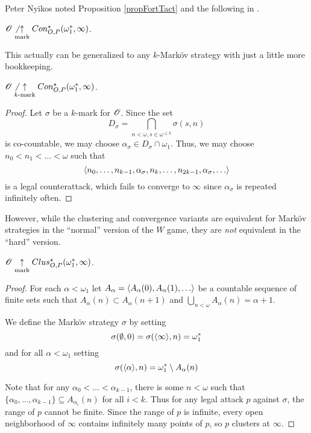 Peter Nyikos noted Proposition \ref{propFortTact} and the following in
\cite{MR1031771}.

\begin{thm}
  $\mathscr{O} \not\underset{\text{mark}}{\uparrow} Con_{O,P}^\star(\omega^*_1,\infty)$.
\end{thm}

This actually can be generalized to any $k$-Mark\"ov strategy with just
a little more bookkeeping.

\begin{thm}
  $\mathscr{O} \not\underset{k\text{-mark}}{\uparrow} Con_{O,P}^\star(\omega^*_1,\infty)$.
\end{thm}

\begin{proof}
  Let $\sigma$ be a $k$-mark for $\mathscr{O}$. Since the set
    \[
      D_\sigma
        =
      \bigcap_{n<\omega,s\in \omega^{\leq k}}
      \sigma(s,n)
    \]
  is co-countable, we may choose $\alpha_\sigma\in D_\sigma\cap\omega_1$.
  Thus, we may choose $n_0<n_1<\dots<\omega$ such that
    \[
      \<n_0,\dots,n_{k-1},\alpha_\sigma,
        n_k,\dots,n_{2k-1},\alpha_\sigma,
        \dots\>
    \]
  is a legal counterattack, which fails to converge to $\infty$ since
  $\alpha_\sigma$ is repeated infinitely often.
\end{proof}

However, while the clustering and convergence variants are equivalent
for Mark\"ov strategies in the ``normal'' version of the $W$ game, they are
\textit{not} equivalent in the ``hard'' version.

\begin{thm}
  $\mathscr{O}\underset{\text{mark}}{\uparrow} Clus_{O,P}^\star(\omega^*_1,\infty)$.
\end{thm}

\begin{proof}
  For each $\alpha<\omega_1$ let $A_\alpha=\<A_\alpha(0),A_\alpha(1),\dots\>$
  be a countable sequence of finite sets such that
  $A_\alpha(n)\subset A_\alpha(n+1)$ and
  $\bigcup_{n<\omega}A_\alpha(n)=\alpha+1$.

  We define the Mark\"ov strategy $\sigma$ by setting
    \[
      \sigma(\emptyset,0) = \sigma(\langle\infty\rangle,n) = \omega^*_1
    \]
  and for all $\alpha<\omega_1$ setting
    \[
      \sigma(\langle\alpha\rangle,n) = \omega^*_1 \setminus A_\alpha(n)
    \]

  Note that for any $\alpha_0<\dots<\alpha_{k-1}$, there is some $n<\omega$
  such that
  $\{\alpha_0,\dots,\alpha_{k-1}\}\subseteq A_{\alpha_i}(n)$ for all $i<k$.
  Thus for any legal attack $p$ against $\sigma$, the range of $p$ cannot
  be finite. Since the range of $p$ is infinite, every open neighborhood of
  $\infty$ contains infinitely many points of $p$, so $p$ clusters at $\infty$.
\end{proof}

